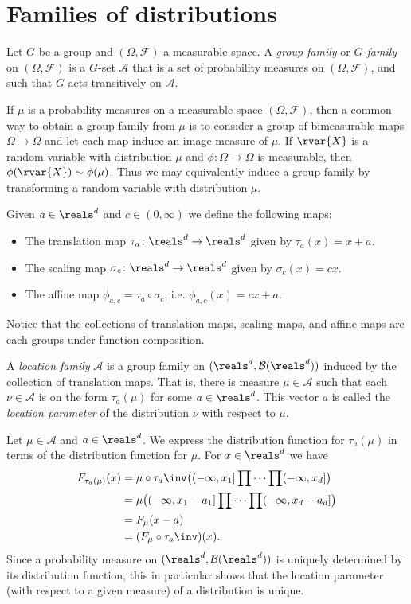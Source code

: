 \documentclass[article, a4paper, 11pt, oneside]{memoir}
\numberwithin{equation}{chapter}
\newcommand{\calF}{\mathcal{F}}
\newcommand{\calA}{\mathcal{A}}
\newcommand{\borel}{\mathcal{B}}
\begin{document}
\section{Families of distributions}

\begin{definition}
    Let $G$ be a group and $(\Omega,\calF)$ a measurable space. A \emph{group family} or \emph{$G$-family} on $(\Omega,\calF)$ is a $G$-set $\calA$ that is a set of probability measures on $(\Omega,\calF)$, and such that $G$ acts transitively on $\calA$.
\end{definition}
%
If $\mu$ is a probability measures on a measurable space $(\Omega,\calF)$, then a common way to obtain a group family from $\mu$ is to consider a group of bimeasurable maps $\Omega \to \Omega$ and let each map induce an image measure of $\mu$. If $\rvar{X}$ is a random variable with distribution $\mu$ and $\phi \colon \Omega \to \Omega$ is measurable, then $\phi(\rvar{X}) \sim \phi(\mu)$. Thus we may equivalently induce a group family by transforming a random variable with distribution $\mu$.

Given $a \in \reals^d$ and $c \in (0,\infty)$ we define the following maps:
%
\begin{itemize}
    \item The translation map $\tau_a \colon \reals^d \to \reals^d$ given by $\tau_a(x) = x + a$.
    \item The scaling map $\sigma_c \colon \reals^d \to \reals^d$ given by $\sigma_c(x) = cx$.
    \item The affine map $\phi_{a,c} = \tau_a \circ \sigma_c$, i.e. $\phi_{a,c}(x) = cx + a$.
\end{itemize}
%
Notice that the collections of translation maps, scaling maps, and affine maps are each groups under function composition.


\begin{definition}
    A \emph{location family} $\calA$ is a group family on $(\reals^d,\borel(\reals^d))$ induced by the collection of translation maps. That is, there is measure $\mu \in \calA$ such that each $\nu \in \calA$ is on the form $\tau_a(\mu)$ for some $a \in \reals^d$. This vector $a$ is called the \emph{location parameter} of the distribution $\nu$ with respect to $\mu$.
\end{definition}
%
Let $\mu \in \calA$ and $a \in \reals^d$. We express the distribution function for $\tau_a(\mu)$ in terms of the distribution function for $\mu$. For $x \in \reals^d$ we have
%
\begin{align*}
    F_{\tau_a(\mu)}(x)
        &= \mu \circ \tau_a\inv \bigl( (-\infty,x_1] \prod \cdots \prod (-\infty,x_d] \bigr) \\
        &= \mu \bigl( (-\infty,x_1-a_1] \prod \cdots \prod (-\infty,x_d-a_d] \bigr) \\
        &= F_\mu(x-a) \\
        &= (F_\mu \circ \tau_a\inv)(x).
\end{align*}
%
Since a probability measure on $(\reals^d, \borel(\reals^d))$ is uniquely determined by its distribution function, this in particular shows that the location parameter (with respect to a given measure) of a distribution is unique.
\end{document}
